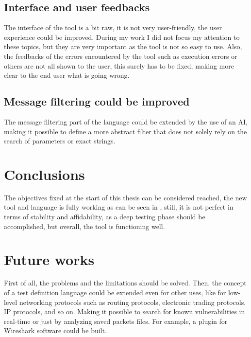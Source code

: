 \subsection{Interface and user feedbacks}
The interface of the tool is a bit raw, it is not very user-friendly, the user experience could be improved. During my work I did not focus my attention to these topics, but they are very important as the tool is not so easy to use. Also, the feedbacks of the errors encountered by the tool such as execution errors or others are not all shown to the user, this surely has to be fixed, making more clear to the end user what is going wrong.

\subsection{Message filtering could be improved}
The message filtering part of the language could be extended by the use of an AI, making it possible to define a more abstract filter that does not solely rely on the search of parameters or exact strings.

\section{Conclusions}
The objectives fixed at the start of this thesis can be considered reached, the new tool and language is fully working as can be seen in \cite{sofia_zanrosso}, still, it is not perfect in terms of stability and affidability, as a deep testing phase should be accomplished, but overall, the tool is functioning well.

\section{Future works}
First of all, the problems and the limitations should be solved. Then, the concept of a test definition language could be extended even for other uses, like for low-level networking protocols such as routing protocols, electronic trading protocols, IP protocols, and so on. Making it possible to search for known vulnerabilities in real-time or just by analyzing saved packets files. For example, a plugin for Wireshark software could be built.





